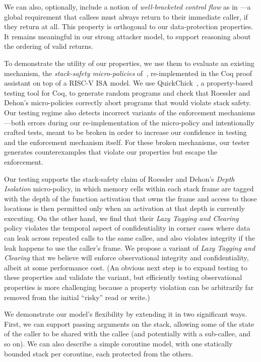 \documentclass[acmtog,review,anonymous]{acmart}\settopmatter{printfolios=true,printccs=false,printacmref=false}
\begin{document}
We can also, optionally, include a notion of {\em well-bracketed control flow}
as in \citet{SkorstengaardSTK}---a global requirement that callees
must always return
to their immediate caller, if they return at all. This property is orthogonal to our
data-protection properties. It remains meaningful in our strong attacker model,
to support reasoning about the ordering of valid returns.

To demonstrate the utility of our properties, we use them
to evaluate an existing mechanism, the
{\em stack-safety micro-policies} of~\citet{DBLP:conf/sp/RoesslerD18}, re-implemented
in the Coq proof assistant on top of a RISC-V ISA model. We
use QuickChick~\citep{Denes:VSL2014,Pierce:SF4}, a property-based testing
tool for Coq, to generate random programs and check
that Roessler and Dehon's micro-policies correctly abort programs that
would violate stack safety.
Our testing regime also detects incorrect variants of the
enforcement mechanisms---both errors
during our re-implementation of the micro-policy and
intentionally crafted tests, meant to be broken in order to increase our confidence
in testing and the enforcement mechanism itself. For these broken
mechanisms, our tester
generates counterexamples that violate our properties but escape the
enforcement.

Our testing supports the stack-safety claim of Roessler and Dehon's {\em Depth
  Isolation} micro-policy, in
which memory cells within each stack frame are tagged with the depth of
the function activation that owns the frame and access to those locations is
then permitted only when an activation at that depth is currently executing.
On the other hand, we find that their \emph{Lazy Tagging and Clearing} policy
violates the temporal aspect of confidentiality in
corner cases where data can leak across repeated calls to the same callee,
and also violates integrity if the leak happens to use the caller's frame. We
propose a variant of {\em Lazy Tagging and Clearing} that
  we believe will enforce observational
integrity and confidentiality, albeit at some performance cost. (An obvious next step
is to expand testing to these properties and validate the variant, but
efficiently
testing observational properties is more challenging because a property
violation can be arbitrarily far removed from the initial ``risky'' read or
write.)

We demonstrate our model's flexibility by extending it in two significant ways.
First, we can support passing arguments on the stack, allowing some of the state of
the caller to be shared with the callee (and potentially with a sub-callee,
and so on).  We can also describe a simple coroutine model, with one
statically bounded stack per coroutine, each protected from the others.
\end{document}
